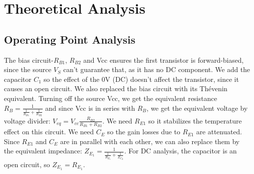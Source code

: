 \section{Theoretical Analysis}
\label{sec:octave}
\subsection{Operating Point Analysis}
The bias circuit-$R_{B1}$, $R_{B2}$ and Vcc ensures the first transistor is forward-biased, since the source $V_S$ can't guarantee that, as it has no DC component. We add the capacitor $C_1$ so the effect of the 0V (DC) doesn't affect the transistor, since it causes an open circuit.
We also replaced the bias circuit with its Thévenin equivalent. Turning off the source Vcc, we get the equivalent resistance $R_B= \frac{1}{\frac{1}{R_{B1}}+\frac{1}{R_{B2}}}$ and since Vcc is in series with $R_B$, we get the equivalent voltage by voltage divider: $V_{eq}=V_{cc}\frac{R_{B2}}{R_{B1}+R_{B2}}$.
We need $R_{E1}$ so it stabilizes the temperature effect on this circuit. We need $C_E$ so the gain losses due to $R_{E1}$ are attenuated.
Since $R_{E1}$ and $C_E$ are in parallel with each other, we can also replace them by the equivalent impedance: $Z_{E_1}=\frac{1}{\frac{1}{R_{E_1}}+\frac{1}{Z_{C_E}}}$. For DC analysis, the capacitor is an open circuit, so $Z_{E_1}=R_{E_1}$.

